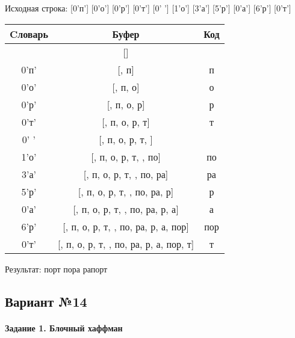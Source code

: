 \documentclass[a4paper, 12pt]{article}
\begin{document}
Исходная строка: [0'п'] [0'о'] [0'р'] [0'т'] [0' '] [1'о'] [3'а'] [5'р'] [0'а'] [6'р'] [0'т']\\
\begin{table}[h!]
\centering
\begin{tabular}{|c|c|c|}
\hline
 Cловарь & Буфер & Код  \\ \hline
 & [] & 
\\ \hline
0'п' & [, п] & п
\\ \hline
0'о' & [, п, о] & о
\\ \hline
0'р' & [, п, о, р] & р
\\ \hline
0'т' & [, п, о, р, т] & т
\\ \hline
0' ' & [, п, о, р, т,  ] &  
\\ \hline
1'о' & [, п, о, р, т,  , по] & по
\\ \hline
3'а' & [, п, о, р, т,  , по, ра] & ра
\\ \hline
5'р' & [, п, о, р, т,  , по, ра,  р] &  р
\\ \hline
0'а' & [, п, о, р, т,  , по, ра,  р, а] & а
\\ \hline
6'р' & [, п, о, р, т,  , по, ра,  р, а, пор] & пор
\\ \hline
0'т' & [, п, о, р, т,  , по, ра,  р, а, пор, т] & т
\\ \hline
\end{tabular}
\end{table}

Результат: порт пора рапорт
\pagebreak
\subsection{Вариант №14}
\paragraph{Задание 1. Блочный хаффман \\}
\end{document}
